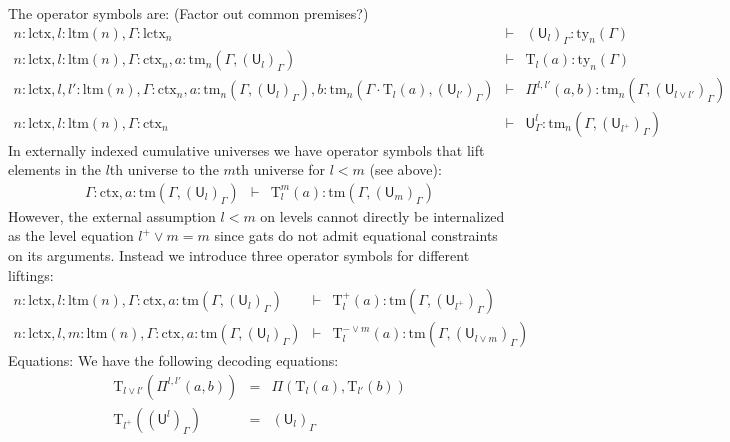 \documentclass[11pt,a4paper]{article}
\theoremstyle{definition}
\newcommand{\UU}{\mathsf{U}}
\def\UU{\mathsf{U}}
\newcommand{\N}{\mathsf{N}}
\def\Pihat{\Pi}
\def\lctx{\mathrm{lctx}}
\def\ltm{\mathrm{ltm}}
\newcommand{\ctx}{\mathrm{ctx}}
\newcommand{\ty}{\mathrm{ty}}
\newcommand{\tm}{\mathrm{tm}}
\def\U{\mathsf{U}}
\newcommand{\Ta}{\mathrm{T}}
\begin{document}
The operator symbols are: (Factor out common premises?)
\begin{eqnarray*}
n : \lctx, l : \ltm(n), \Gamma : \lctx_n &\vdash& (\U_{l})_\Gamma : \ty_n(\Gamma)\\
n : \lctx, l : \ltm(n), \Gamma : \ctx_n, a : \tm_n(\Gamma,(\U_{l})_\Gamma) &\vdash& {\Ta_{l}}(a) : \ty_n(\Gamma)\\
n : \lctx, l, l' : \ltm(n), \Gamma : \ctx_n,
a : \tm_n(\Gamma,(\U_{l})_\Gamma),
b :  \tm_n(\Gamma \cdot \Ta_{l}(a), (\U_{l'})_\Gamma)
&\vdash&
 \Pihat^{l,l'}(a,b) : \tm_n(\Gamma,(\U_{l \vee l'})_\Gamma)\\
 n : \lctx, l : \ltm(n),\Gamma : \ctx_n&\vdash&\UU^l_\Gamma: \tm_n(\Gamma,(\UU_{l^+})_\Gamma)
\end{eqnarray*}
In externally indexed cumulative universes we have operator symbols that lift elements in the $l$th universe to the $m$th universe for $l < m$ (see above):
\begin{eqnarray*}
\Gamma : \ctx, a : \tm(\Gamma,(\U_{l})_\Gamma) &\vdash& {\Ta^m_{l}}(a) : \tm(\Gamma,(\U_{m})_\Gamma)
\end{eqnarray*}
However, the external assumption $l < m$ on levels cannot directly be internalized as the level equation $l^+ \vee m = m$ since gats do not admit equational constraints on its arguments. Instead we introduce three operator symbols for different liftings:
\begin{eqnarray*}
n : \lctx, l : \ltm(n), \Gamma : \ctx, a : \tm(\Gamma,(\U_{l})_\Gamma) &\vdash& {\Ta^{+}_{l}}(a) : \tm(\Gamma,(\U_{l^+})_\Gamma)\\
n : \lctx, l,m : \ltm(n), \Gamma : \ctx, a : \tm(\Gamma,(\U_{l})_\Gamma) &\vdash& {\Ta^{- \vee m}_{l}}(a) : \tm(\Gamma,(\U_{l \vee m})_\Gamma)
\end{eqnarray*}
Equations:
We have the following decoding equations:
\begin{eqnarray*}
\Ta_{l \vee l'}(\Pi^{l,l'}(a,b)) &=& \Pi(\Ta_l(a),\Ta_{l'}(b))\\
\Ta_{l^+}((\UU^l)_\Gamma) &=& (\UU_l)_\Gamma 
\end{eqnarray*}
\end{document}
